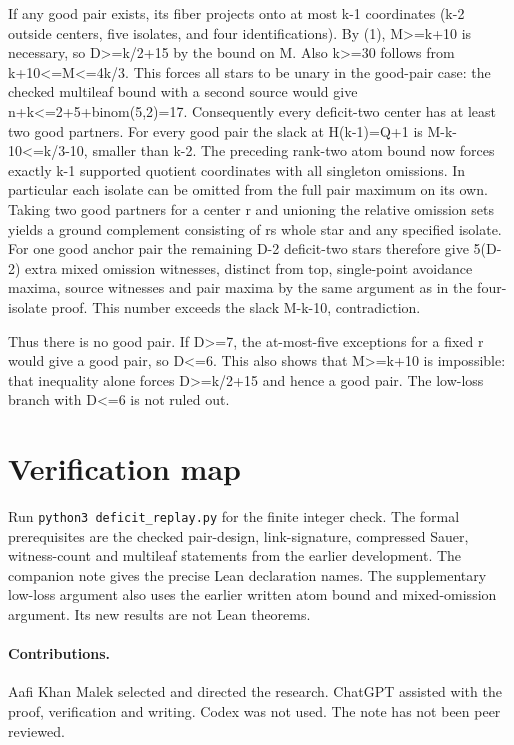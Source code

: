 \documentclass[11pt,letterpaper]{article}
\begin{document}
If any good pair exists, its fiber projects onto at most k-1 coordinates
(k-2 outside centers, five isolates, and four identifications). By (1),
M>=k+10 is necessary, so D>=k/2+15 by the bound on M. Also k>=30 follows
from k+10<=M<=4k/3. This forces all stars to be unary in the good-pair
case: the checked multileaf bound with a second source would give
n+k<=2+5+binom(5,2)=17. Consequently every deficit-two center has at
least two good partners. For every good pair the slack at H(k-1)=Q+1 is
M-k-10<=k/3-10, smaller than k-2. The preceding rank-two atom bound now
forces exactly k-1 supported quotient coordinates with all singleton
omissions. In particular each isolate can be omitted from the full pair
maximum on its own. Taking two good partners for a center r and unioning
the relative omission sets yields a ground complement consisting of
r\textquotesingle s whole star and any specified isolate. For one good
anchor pair the remaining D-2 deficit-two stars therefore give 5(D-2)
extra mixed omission witnesses, distinct from top, single-point
avoidance maxima, source witnesses and pair maxima by the same argument
as in the four-isolate proof. This number exceeds the slack M-k-10,
contradiction.

Thus there is no good pair. If D>=7, the at-most-five exceptions for a
fixed r would give a good pair, so D<=6. This also shows that M>=k+10 is
impossible: that inequality alone forces D>=k/2+15 and hence a good pair.
The low-loss branch with D<=6 is not ruled out.

\section*{Verification map}\label{verification-map}

Run \texttt{python3 deficit\_replay.py} for the finite integer check.
The formal prerequisites are the checked pair-design, link-signature,
compressed Sauer, witness-count and multileaf statements from the earlier
development. The companion note gives the precise Lean declaration names.
The supplementary low-loss argument also uses the earlier written atom
bound and mixed-omission argument. Its new results are not Lean theorems.

\paragraph{Contributions.}
Aafi Khan Malek selected and directed the research. ChatGPT assisted
with the proof, verification and writing. Codex was not used.
The note has not been peer reviewed.
\end{document}

